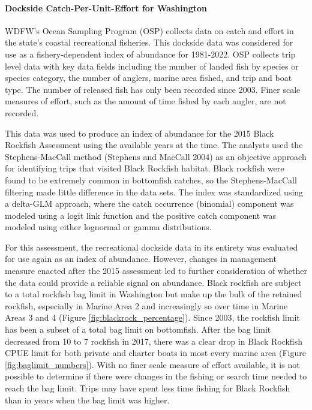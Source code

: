 \documentclass[11pt,
  english,
  letterpaper,
]{article}
\begin{document}
\hypertarget{dockside-catch-per-unit-effort-for-washington}{%
\paragraph{Dockside Catch-Per-Unit-Effort for Washington}\label{dockside-catch-per-unit-effort-for-washington}}

WDFW's Ocean Sampling Program (OSP) collects data on catch and effort in the state's coastal recreational fisheries. This dockside data was considered for use as a fishery-dependent index of abundance for 1981-2022. OSP collects trip level data with key data fields including the number of landed fish by species or species category, the number of anglers, marine area fished, and trip and boat type. The number of released fish has only been recorded since 2003. Finer scale measures of effort, such as the amount of time fished by each angler, are not recorded.

This data was used to produce an index of abundance for the 2015 Black Rockfish Assessment using the available years at the time. The analysts used the Stephens-MacCall method (Stephens and MacCall 2004) as an objective approach for identifying trips that visited Black Rockfish habitat. Black rockfish were found to be extremely common in bottomfish catches, so the Stephens-MacCall filtering made little difference in the data sets. The index was standardized using a delta-GLM approach, where the catch occurrence (binomial) component was modeled using a logit link function and the positive catch component was modeled using either lognormal or gamma distributions.

For this assessment, the recreational dockside data in its entirety was evaluated for use again as an index of abundance. However, changes in management measure enacted after the 2015 assessment led to further consideration of whether the data could provide a reliable signal on abundance. Black rockfish are subject to a total rockfish bag limit in Washington but make up the bulk of the retained rockfish, especially in Marine Area 2 and increasingly so over time in Marine Areas 3 and 4 (Figure \ref{fig:blackrock_percentage}). Since 2003, the rockfish limit has been a subset of a total bag limit on bottomfish. After the bag limit decreased from 10 to 7 rockfish in 2017, there was a clear drop in Black Rockfish CPUE limit for both private and charter boats in most every marine area (Figure \ref{fig:baglimit_numbers}). With no finer scale measure of effort available, it is not possible to determine if there were changes in the fishing or search time needed to reach the bag limit. Trips may have spent less time fishing for Black Rockfish than in years when the bag limit was higher.
\end{document}
